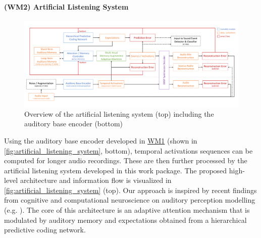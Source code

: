 \documentclass[11pt]{article}
\newcommand{\wpdef}[2]{\hypertarget{sec:W#1}{\paragraph*{(W#1) #2}\label{sec:W#1}}}
\newcommand{\wpref}[2]{\hyperlink{sec:W#1}{#2}}
\begin{document}

\wpdef{M2}{Artificial Listening System} %

%
\begin{figure}[h]
    \centering
    \includegraphics[width=\textwidth]{figures/artificial_listening_system.pdf}
    \vspace{-0.9cm}
    \caption{Overview of the artificial listening system (top) including the auditory base encoder (bottom)}
    \label{fig:artificial_listening_system}
\end{figure}
%
Using the auditory base encoder developed in \wpref{M1}{WM1} (shown in  \autoref{fig:artificial_listening_system}, bottom), temporal activations sequences can be computed for longer audio recordings.
These are then further processed by the artificial listening system developed in this work package.
The proposed high-level architecture and information flow is visualized in 
\autoref{fig:artificial_listening_system} (top).
Our approach is inspired by recent findings from cognitive and computational neuroscience on auditory perception modelling (e.g. \cite{chakrabarty2019gestalt,bellur2020taslp}).
The core of this architecture is an adaptive attention mechanism that is modulated by auditory memory and expectations obtained from a hierarchical predictive coding network.
\end{document}
